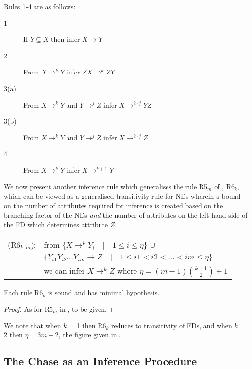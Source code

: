 \medskip
Rules 1-4 are as follows:
\begin{description}
\item[1] If $Y \subseteq X$ then infer $X \to Y$
\item[2] From $X \to^k Y$ infer $ZX \to^k ZY$
\item[3(a)] From $X \to^k Y$ and $Y \to^j Z$ infer $X \to^{k \cdot j} YZ$
\item[3(b)] From $X \to^k Y$ and $Y \to^j Z$ infer $X \to^{k \cdot j} Z$
\item[4] From $X \to^k Y$ infer $X \to^{k + 1} Y$
\end{description}

We now present another inference rule which generalises the rule
R5$_m$ of \cite{gm85b}, R6$_k$, which can be viewed as a generalised
transitivity rule for NDs wherein a bound on the number of attributes
required for inference is created based on the branching factor of the
NDs {\em and} the number of attributes on the left hand side of the FD
which determines attribute $Z$.

\smallskip
{\line
\begin{table}[ht]
\begin{tabular}{cl} \\
(R6$_{k,m}$): 	& from  $\{ X \to^{k} Y_i \quad |  \quad 1 \le i \le
		\eta \}$    $\cup$ \\
		&    $\{ Y_{i1}Y_{i2} \ldots Y_{im} \to Z   \quad |  \quad 1
		\le i1 < i2 < \ldots < im \le \eta \}$ \\ 
\rule{0cm}{5mm} & we can infer $X \to^{k} Z$ where $\eta =
		(m-1){k+1 \choose 2} + 1$  \\
\end{tabular}
\end{table}}
\smallskip

\begin{theorem}\label{th:1}
\begin{rm}
Each rule R6$_{k}$ is sound and has minimal hypothesis.
\end{rm}
\end{theorem}

{\em Proof.} As for R5$_m$ in \cite{gm85b}, to be given. $\Box$

\medskip

We note that when $k$ = 1 then R6$_k$ reduces to transitivity of FDs,
and when $k$ = 2 then $\eta = 3m - 2$, the figure given in
\cite{gm85b}. 


\subsection{The Chase as an Inference Procedure}\label{subsec:nd_ch_inf}

